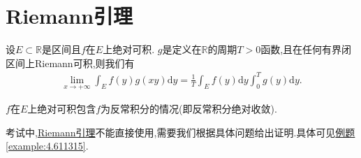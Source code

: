 \documentclass[../../main.tex]{subfiles}%
\begin{document}
\section{Riemann引理}

\begin{theorem}\label{theorem:Riemann引理}
设\(E\subset\mathbb{R}\)是区间且\(f\)在\(E\)上绝对可积. \(g\)是定义在\(\mathbb{R}\)的周期\(T > 0\)函数,且在任何有界闭区间上Riemann可积,则我们有
\begin{align}\label{equation:4.1-1.1}
\lim_{x\rightarrow +\infty}\int_{E}f(y)g(xy)\mathrm{d}y=\frac{1}{T}\int_{E}f(y)\mathrm{d}y\int_{0}^{T}g(y)\mathrm{d}y.
\end{align}
\end{theorem}
\begin{remark}
\(f\)在\(E\)上绝对可积包含$f$为反常积分的情况(即反常积分绝对收敛).

考试中,\hyperref[theorem:Riemann引理]{Riemann引理}不能直接使用,需要我们根据具体问题给出证明.具体可见\hyperref[example:4.611315]{例题\ref{example:4.611315}}.
\end{remark}
\end{document}
